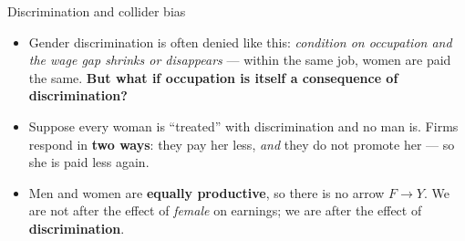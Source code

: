 \documentclass[
  11pt,
  ignorenonframetext,
  aspectratio=169,
]{beamer}
\providecommand{\tightlist}{%
  \setlength{\itemsep}{0pt}\setlength{\parskip}{0pt}}
\begin{document}
\begin{frame}{Discrimination and collider bias}
\protect{}\label{discrimination-and-collider-bias}
\begin{itemize}
\tightlist
\item
  Gender discrimination is often denied like this: \emph{condition on
  occupation and the wage gap shrinks or disappears} --- within the same
  job, women are paid the same. \textbf{But what if occupation is itself
  a consequence of discrimination?}
\item
  Suppose every woman is ``treated'' with discrimination and no man is.
  Firms respond in \textbf{two ways}: they pay her less, \emph{and} they
  do not promote her --- so she is paid less again.
\end{itemize}

\vspace{-0.2em}
\begin{center}
\end{center}
\vspace{-0.4em}

\begin{itemize}
\tightlist
\item
  Men and women are \textbf{equally productive}, so there is no arrow
  \(F \to Y\). We are not after the effect of \emph{female} on earnings;
  we are after the effect of \textbf{discrimination}.
\end{itemize}
\end{frame}
\end{document}
